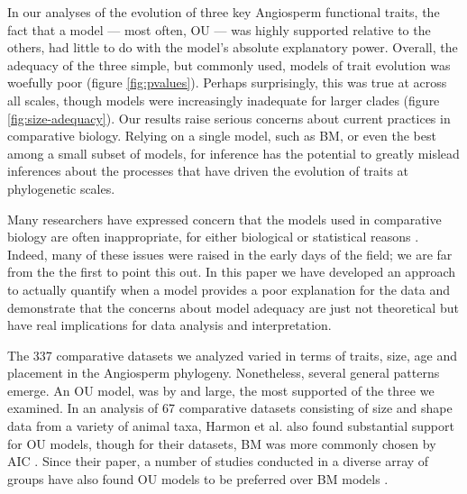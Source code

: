 \documentclass[a4paper,11pt]{article}
\begin{document}
In our analyses of the evolution of three key Angiosperm functional traits, the fact that a model --- most often, OU --- was highly supported relative to the others, had little to do with the model's absolute explanatory power. Overall, the adequacy of the three simple, but commonly used, models of trait evolution was woefully poor (figure \ref{fig:pvalues}). Perhaps surprisingly, this was true at across all scales, though models were increasingly inadequate for larger clades (figure \ref{fig:size-adequacy}). Our results raise serious concerns about current practices in comparative biology. Relying on a single model, such as BM, or even the best among a small subset of models, for inference has the potential to greatly mislead inferences about the processes that have driven the evolution of traits at phylogenetic scales.

Many researchers have expressed concern that the models used in comparative biology are often inappropriate, for either biological or statistical reasons \citep{Felsenstein1985, Felsenstein1988, HarveyPagel1991, Garland1992, Diaz1996, HansenMartins1996, Price1997, Garland1999, GarlandIves2000, HansenOrzack2005, Hansen2012, Felsenstein2012, Boettiger2012, SlaterPennell}. Indeed, many of these issues were raised in the early days of the field; we are far from the the first to point this out.
In this paper we have developed an approach to actually quantify when a model provides a poor explanation for the data and demonstrate that the concerns about model adequacy are just not theoretical but have real implications for data analysis and interpretation.

The 337 comparative datasets we analyzed varied in terms of traits, size, age and placement in the Angiosperm phylogeny. Nonetheless, several general patterns emerge. An OU model, was by and large, the most supported of the three we examined. In an analysis of 67 comparative datasets consisting of size and shape data from a variety of animal taxa, Harmon et al. \citep{Harmon2010} also found substantial support for OU models, though for their datasets, BM was more commonly chosen by AIC \citep[we note, however, that many of their datasets were quite small; see][]{SlaterPennell}. Since their paper, a number of studies conducted in a diverse array of groups have also found OU models to be preferred over BM models \citep[e.g.,][]{Burbrink2012, Wiens2013, Lopez2013}. 
\end{document}
